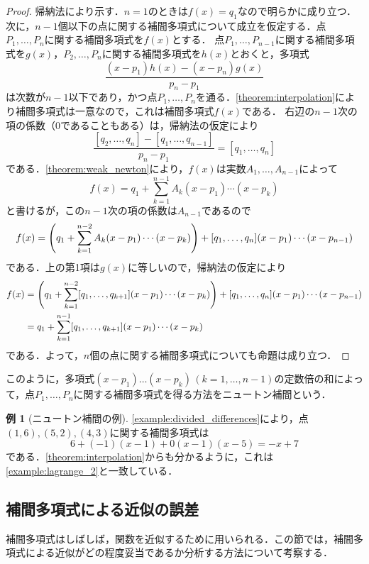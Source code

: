 \documentclass[a4paper]{ltjsarticle}
\theoremstyle{definition}
\newtheorem{example}{例}[section]
\DeclarePairedDelimiter{\pqty}{\lparen}{\rparen}
\begin{document}
\begin{proof}
  帰納法により示す．$n=1$のときは$f(x)=q_1$なので明らかに成り立つ．
  次に，$n-1$個以下の点に関する補間多項式について成立を仮定する．点$P_1,\dots,P_n$に関する補間多項式を$f(x)$とする．
  点$P_1, \dots, P_{n-1}$に関する補間多項式を$g(x)$，$P_2, \dots, P_n$に関する補間多項式を$h(x)$とおくと，多項式
  \[
     \frac{(x-p_1)h(x) - (x-p_n)g(x)}{p_n-p_1}
  \]
  は次数が$n-1$以下であり，かつ点$P_1,\dots,P_n$を通る．\cref{theorem:interpolation}により補間多項式は一意なので，これは補間多項式$f(x)$である．
  右辺の$n-1$次の項の係数（$0$であることもある）は，帰納法の仮定により
  \[
    \frac{[q_2,\dots,q_n]-[q_1,\dots,q_{n-1}]}{p_n-p_1} = [q_1,\dots,q_n]
  \]
  である．\cref{theorem:weak_newton}により，$f(x)$は実数$A_1,\dots,A_{n-1}$によって
  \[
    f(x) = q_1 + \sum_{k=1}^{n-1} A_k(x-p_1)\dotsm (x-p_k)
  \]
  と書けるが，この$n-1$次の項の係数は$A_{n-1}$であるので
  \[
    f(x) = \pqty*{q_1 + \sum_{k=1}^{n-2} A_k(x-p_1)\dotsm (x-p_k)} + [q_1,\dots,q_n](x-p_1)\dotsm (x-p_{n-1})
  \]
  である．上の第1項は$g(x)$に等しいので，帰納法の仮定により
  \begin{align*}
    f(x)
    &= \pqty*{q_1 + \sum_{k=1}^{n-2} [q_1,\dots,q_{k+1}](x-p_1)\dotsm (x-p_k)} + [q_1,\dots,q_n](x-p_1)\dotsm (x-p_{n-1}) \\
    &= q_1 + \sum_{k=1}^{n-1} [q_1,\dots,q_{k+1}](x-p_1)\dotsm (x-p_k)
  \end{align*}
  である．よって，$n$個の点に関する補間多項式についても命題は成り立つ．
\end{proof}

このように，多項式$(x-p_1) \dots (x-p_k)\,(k=1,\dots,n-1)$の定数倍の和によって，点$P_1,\dots,P_n$に関する補間多項式を得る方法をニュートン補間という．

\begin{example}[ニュートン補間の例]
  \cref{example:divided_differences}により，点$(1,6),(5,2),(4,3)$に関する補間多項式は
  \[
    6+(-1)(x-1)+0(x-1)(x-5) = -x+7
  \]
  である．\cref{theorem:interpolation}からも分かるように，これは\cref{example:lagrange_2}と一致している．
\end{example}

\subsection{補間多項式による近似の誤差}

補間多項式はしばしば，関数を近似するために用いられる．この節では，補間多項式による近似がどの程度妥当であるか分析する方法について考察する．
\end{document}
